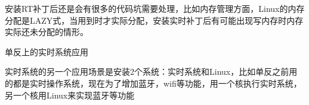 安装RT补丁后还是会有很多的代码坑需要处理，比如内存管理方面，Linux的内存分配是LAZY式，当用到时才实际分配，安装实时补丁后有可能出现写内存时内存实际还未分配的情形。

\begin{example*}
  \wdexpbox
  {\caption{单反上的实时系统应用}}
  {实时系统的另一个应用场景是安装2个系统：实时系统和Linux，比如单反之前用的都是实时操作系统，现在为了增加蓝牙，wifi等功能，用一个核执行实时系统，另一个核用Linux来实现蓝牙等功能}
\end{example*}

